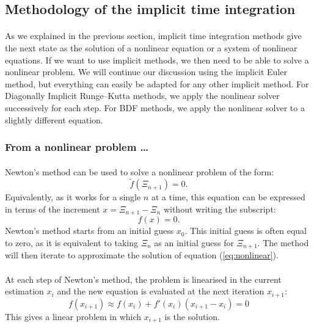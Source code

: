     \subsection{Methodology of the implicit time integration}

      \paragraph{}
      As we explained in the previous section, implicit time integration methods give the next state as the solution of a nonlinear equation or a system of nonlinear equations.
      If we want to use implicit methods, we then need to be able to solve a nonlinear problem.
      We will continue our discussion using the implicit Euler method, but everything can easily be adapted for any other implicit method.
      For Diagonally Implicit Runge--Kutta methods, we apply the nonlinear solver successively for each step.
      For BDF methods, we apply the nonlinear solver to a slightly different equation.


      \subsubsection{From a nonlinear problem \dots}

      	\paragraph{}
      	Newton's method can be used to solve a nonlinear problem of the form:
      	\begin{equation}
      		\tilde{f}\left(\Xi_{n+1}\right) = 0 .
      	\end{equation}
        Equivalently, as it works for a single $n$ at a time, this equation can be expressed in terms of the increment $x = \Xi_{n+1} - \Xi_n$ without writing the subscript:
        \begin{equation}\label{eq:nonlinear}
      		f\left(x\right) = 0 .
      	\end{equation}
        Newton's method starts from an initial guess $x_0$.
        This initial guess is often equal to zero, as it is equivalent to taking $\Xi_n$ as an initial guess for $\Xi_{n+1}$.
        The method will then iterate to approximate the solution of equation (\ref{eq:nonlinear}).

        \paragraph{}
        At each step of Newton's method, the problem is linearised in the current estimation $x_i$ and the new equation is evaluated at the next iteration $x_{i+1}$:
        \begin{equation}\label{eq:nonlinear_linearised}
          f\left(x_{i+1}\right) \approx f\left(x_i\right) + f'\left(x_i\right) \left( x_{i+1} - x_i \right) = 0
        \end{equation}
        This gives a linear problem in which $x_{i+1}$ is the solution.


